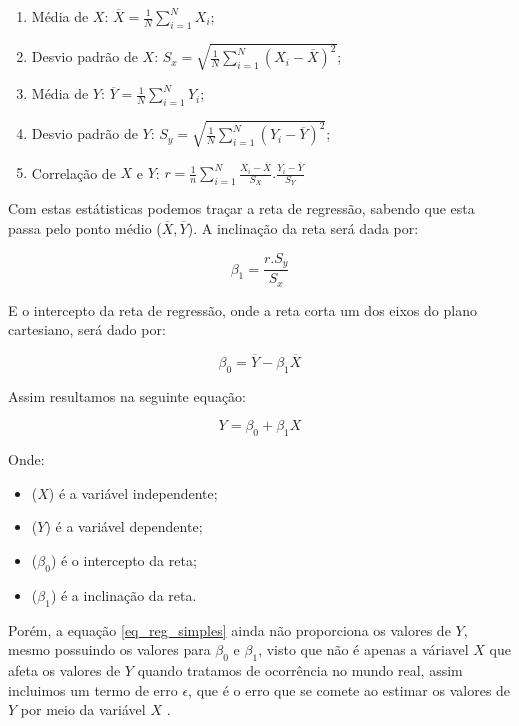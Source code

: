 \documentclass[
	12pt,				%
	openright,			%
	oneside,			%
	a4paper,			%
	english,			%
	brazil				%
	]{abntex2}
\begin{document}
\begin{enumerate}
	\item Média de $X$: $\overline{X} = \frac{1}{N} \sum_{i=1}^{N} X_i$;
	\item Desvio padrão de $X$: $S_x = \sqrt{ \frac{1}{N} \sum_{i=1}^{N} (X_i - \overline{X})^2 }$;
	\item Média de $Y$: $\overline{Y} = \frac{1}{N} \sum_{i=1}^{N} Y_i$;
	\item Desvio padrão de $Y$: $S_y = \sqrt{ \frac{1}{N} \sum_{i=1}^{N} (Y_i - \overline{Y})^2 }$;
	\item Correlação de $X$ e $Y$: $r = \frac{1}{n} \sum_{i=1}^{N} \frac{X_i - \overline{X}}{S_X} . \frac{Y_i - \overline{Y}}{S_Y}$
\end{enumerate}

Com estas estátisticas podemos traçar a reta de regressão, sabendo que esta passa pelo ponto médio
($\overline{X}, \overline{Y}$). A inclinação da reta será dada por:

\begin{equation}
	\label{inclinacao_reta}
	\beta_1 = \frac{r.S_y}{S_x}
\end{equation}

E o intercepto da reta de regressão, onde a reta corta um dos eixos do plano cartesiano, 
será dado por:

\begin{equation}
	\label{intercepto_reta}
	\beta_0 = \overline{Y} - \beta_1 \overline{X}
\end{equation}

Assim resultamos na seguinte equação:

\begin{equation}
\label{eq_reg_simples}
	Y = \beta_0 + \beta_1X
\end{equation}

Onde:
\begin{itemize}
	\item ($X$) é a variável independente;
	\item ($Y$) é a variável dependente;
	\item ($\beta_0$) é o intercepto da reta;
	\item ($\beta_1$) é a inclinação da reta. 
\end{itemize}

Porém, a equação \ref{eq_reg_simples} ainda não proporciona os valores de $Y$, mesmo possuindo
os valores para $\beta_0$ e $\beta_1$, visto que não é apenas a váriavel $X$ que afeta os valores de
$Y$ quando tratamos de ocorrência no mundo real, assim incluimos um termo de erro $\epsilon$, que é
o erro que se comete ao estimar os valores de $Y$ por meio da variável $X$ \cite{modelos_regressao_linear}.
\end{document}
